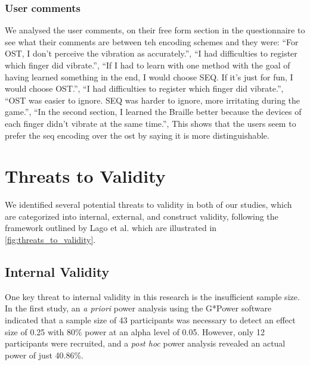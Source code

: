 \subsubsection{User comments}
We analysed the user comments, on their free form section in the questionnaire to see what their comments are between teh encoding schemes and they were:
\enquote{For OST, I don't perceive the vibration as accurately.},
\enquote{I had difficulties to register which finger did vibrate.},
\enquote{If I had to learn with one method with the goal of having learned something in the end, I would choose SEQ. If it's just for fun, I would choose OST.},
\enquote{I had difficulties to register which finger did vibrate.},
\enquote{OST was easier to ignore. SEQ was harder to ignore, more irritating during the game.},
\enquote{In the second section, I learned the Braille better because the devices of each finger didn’t vibrate at the same time.},
This shows that the users seem to prefer the \gls{seq} encoding over the \gls{ost} by saying it is more distinguishable.





\section{Threats to Validity}

We identified several potential threats to validity in both of our studies, which are categorized into internal, external, and construct validity, following the framework outlined by Lago et al. \cite{10.1145/3674805.3686691} which are illustrated in \autoref{fig:threats_to_validity}.

\subsection{Internal Validity}

One key threat to internal validity in this research is the insufficient sample size. In the first study, an \textit{a priori} power analysis using the G*Power software indicated that a sample size of 43 participants was necessary to detect an effect size of 0.25 with 80\% power at an alpha level of 0.05. However, only 12 participants were recruited, and a \textit{post hoc} power analysis revealed an actual power of just 40.86\%. 

